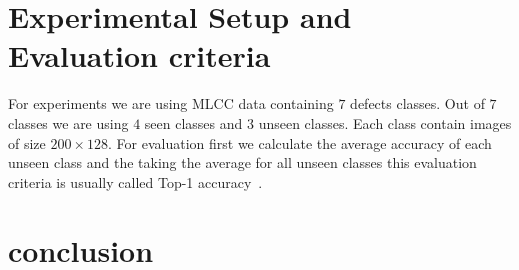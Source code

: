 \documentclass[11pt, conference, english]{IEEEtran}
\theoremstyle{plain}
\theoremstyle{definition}
\theoremstyle{remark}
\begin{document}
	\section{Experimental Setup and Evaluation criteria}
	For experiments we are using MLCC data containing $7$ defects classes. Out of $7$ classes we are using $4$ seen classes and $3$ unseen classes. Each class contain images of size $200 \times 128$. For evaluation first we calculate the average accuracy of each unseen class and the taking the average for all unseen classes this evaluation criteria is usually called Top-1 accuracy~\cite{}. 
	\section{conclusion}
	
%	
\end{document}
